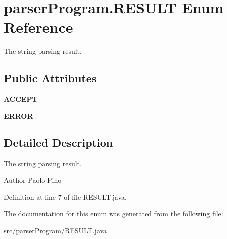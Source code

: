 \hypertarget{enumparser_program_1_1_r_e_s_u_l_t}{\section{parser\-Program.\-R\-E\-S\-U\-L\-T Enum Reference}
\label{enumparser_program_1_1_r_e_s_u_l_t}
}


The string parsing result.  


\subsection*{Public Attributes}
\begin{DoxyCompactItemize}
\item 
\hypertarget{enumparser_program_1_1_r_e_s_u_l_t_a1e9fd6ad602e25983c6104f10c9bbf29}{{\bfseries A\-C\-C\-E\-P\-T}}\label{enumparser_program_1_1_r_e_s_u_l_t_a1e9fd6ad602e25983c6104f10c9bbf29}

\item 
\hypertarget{enumparser_program_1_1_r_e_s_u_l_t_ab53193d78e07c487ad5b3a77fc90de3a}{{\bfseries E\-R\-R\-O\-R}}\label{enumparser_program_1_1_r_e_s_u_l_t_ab53193d78e07c487ad5b3a77fc90de3a}

\end{DoxyCompactItemize}


\subsection{Detailed Description}
The string parsing result. 

\begin{DoxyAuthor}{Author}
Paolo Pino 
\end{DoxyAuthor}


Definition at line 7 of file R\-E\-S\-U\-L\-T.\-java.



The documentation for this enum was generated from the following file\-:\begin{DoxyCompactItemize}
\item 
src/parser\-Program/R\-E\-S\-U\-L\-T.\-java\end{DoxyCompactItemize}
